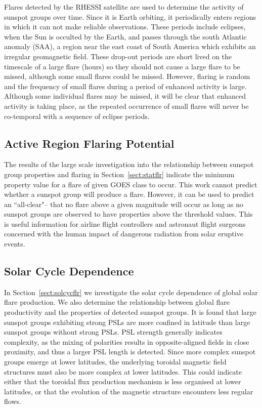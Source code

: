 Flares detected by the \gls{RHESSI} satellite are used to determine the activity of sunspot groups over time. Since it is Earth orbiting, it periodically enters regions in which it can not make reliable observations. These periods include eclipses, when the Sun is occulted by the Earth, and passes through the south Atlantic anomaly (SAA), a region near the east coast of South America which exhibits an irregular geomagnetic field. These drop-out periods are short lived on the timescale of a large flare (hours) so they should not cause a large flare to be missed, although some small flares could be missed. However, flaring is random and the frequency of small flares during a period of enhanced activity is large. Although some individual flares may be missed, it will be clear that enhanced activity is taking place, as the repeated occurrence of small flares will never be co-temporal with a sequence of eclipse periods.

\subsection{Active Region Flaring Potential}

The results of the large scale investigation into the relationship between sunspot group properties and flaring in Section~\ref{sect:statflr} indicate the minimum property value for a flare of given \gls{GOES} class to occur. This work cannot predict whether a sunspot group will produce a flare. However, it can be used to predict an ``all-clear"-- that no flare above a given magnitude will occur as long as no sunspot groups are observed to have properties above the threshold values. This is useful information for airline flight controllers and astronaut flight surgeons concerned with the human impact of dangerous radiation from solar eruptive events.

\subsection{Solar Cycle Dependence}

In Section~\ref{sect:solcycflr} we investigate the solar cycle dependence of global solar flare production. We also determine the relationship between global flare productivity and the properties of detected sunspot groups. It is found that large sunspot groups exhibiting strong \glspl{PSL} are more confined in latitude than large sunspot groups without strong \glspl{PSL}. \gls{PSL} strength generally indicates complexity, as the mixing of polarities results in opposite-aligned fields in close proximity, and thus a larger \gls{PSL} length is detected. Since more complex sunspot groups emerge at lower latitudes, the underlying toroidal magnetic field structures must also be more complex at lower latitudes. This could indicate either that the toroidal flux production mechanism is less organised at lower latitudes, or that the evolution of the magnetic structure encounters less regular flows.


